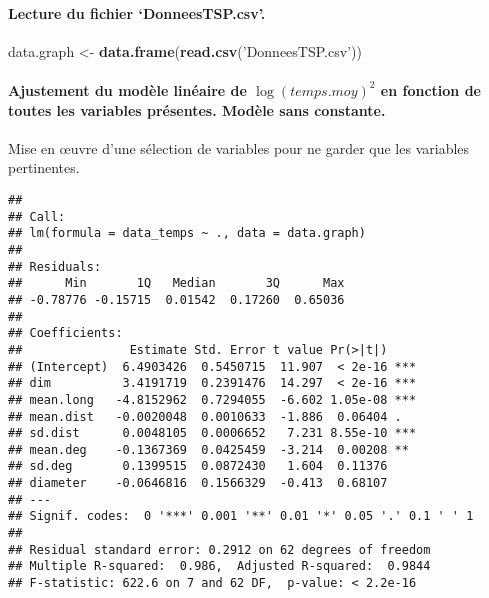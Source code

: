 \documentclass[
]{article}
\newenvironment{Shaded}{\begin{snugshade}}{\end{snugshade}}
\newcommand{\KeywordTok}[1]{\textcolor[rgb]{0.13,0.29,0.53}{\textbf{#1}}}
\newcommand{\NormalTok}[1]{#1}
\newcommand{\StringTok}[1]{\textcolor[rgb]{0.31,0.60,0.02}{#1}}
\begin{document}
\hypertarget{lecture-du-fichier-donneestsp.csv.}{%
\paragraph{Lecture du fichier
`DonneesTSP.csv'.}\label{lecture-du-fichier-donneestsp.csv.}}

\begin{Shaded}
\begin{Highlighting}[]
\NormalTok{data.graph <-}\StringTok{ }\KeywordTok{data.frame}\NormalTok{(}\KeywordTok{read.csv}\NormalTok{(}\StringTok{'DonneesTSP.csv'}\NormalTok{))}
\end{Highlighting}
\end{Shaded}

\hypertarget{ajustement-du-moduxe8le-linuxe9aire-de-logtemps.moy2-en-fonction-de-toutes-les-variables-pruxe9sentes.-moduxe8le-sans-constante.}{%
\paragraph{\texorpdfstring{Ajustement du modèle linéaire de
\(\log(temps.moy)^2\) en fonction de toutes les variables présentes.
Modèle sans
constante.}{Ajustement du modèle linéaire de \textbackslash log(temps.moy)\^{}2 en fonction de toutes les variables présentes. Modèle sans constante.}}\label{ajustement-du-moduxe8le-linuxe9aire-de-logtemps.moy2-en-fonction-de-toutes-les-variables-pruxe9sentes.-moduxe8le-sans-constante.}}

Mise en \oe uvre d'une sélection de variables pour ne garder que les
variables pertinentes.

\begin{verbatim}
## 
## Call:
## lm(formula = data_temps ~ ., data = data.graph)
## 
## Residuals:
##      Min       1Q   Median       3Q      Max 
## -0.78776 -0.15715  0.01542  0.17260  0.65036 
## 
## Coefficients:
##               Estimate Std. Error t value Pr(>|t|)    
## (Intercept)  6.4903426  0.5450715  11.907  < 2e-16 ***
## dim          3.4191719  0.2391476  14.297  < 2e-16 ***
## mean.long   -4.8152962  0.7294055  -6.602 1.05e-08 ***
## mean.dist   -0.0020048  0.0010633  -1.886  0.06404 .  
## sd.dist      0.0048105  0.0006652   7.231 8.55e-10 ***
## mean.deg    -0.1367369  0.0425459  -3.214  0.00208 ** 
## sd.deg       0.1399515  0.0872430   1.604  0.11376    
## diameter    -0.0646816  0.1566329  -0.413  0.68107    
## ---
## Signif. codes:  0 '***' 0.001 '**' 0.01 '*' 0.05 '.' 0.1 ' ' 1
## 
## Residual standard error: 0.2912 on 62 degrees of freedom
## Multiple R-squared:  0.986,  Adjusted R-squared:  0.9844 
## F-statistic: 622.6 on 7 and 62 DF,  p-value: < 2.2e-16
\end{verbatim}
\end{document}
